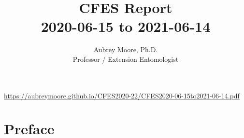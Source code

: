 



\usepackage[breaklinks=true, colorlinks=True, allcolors=blue]{hyperref}

\usepackage{indentfirst} 
\usepackage{comment}

\newcommand{\activities}{\medskip\textbf{Activities}}
\newcommand{\plans}{\medskip\textbf{Plans}}

\makeatletter

\makeatother






\title{CFES Report\\2020-06-15 to 2021-06-14}

\author{Aubrey Moore, Ph.D.\\
Professor / Extension Entomologist}

\maketitle

{\small \url{https://aubreymoore.github.io/CFES2020-22/CFES2020-06-15to2021-06-14.pdf}}

%
\setcounter{secnumdepth}{0} %
\setcounter{tocdepth}{2}
\tableofcontents{}

\clearpage


\section{Preface}
	
